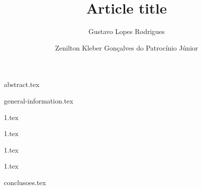 \documentclass[12pt]{article}
\title{Article title}
\author{Gustavo Lopes Rodrigues\inst{1} \and Zenilton Kleber Gonçalves do Patrocínio Júnior\inst{1}}
\begin{document}
 

  \maketitle


  {abstract.tex}


  {general-information.tex}


  {1.tex}


  {1.tex}


  {1.tex}


  {1.tex}


  {conclusoes.tex}


  
  
  
\end{document}
